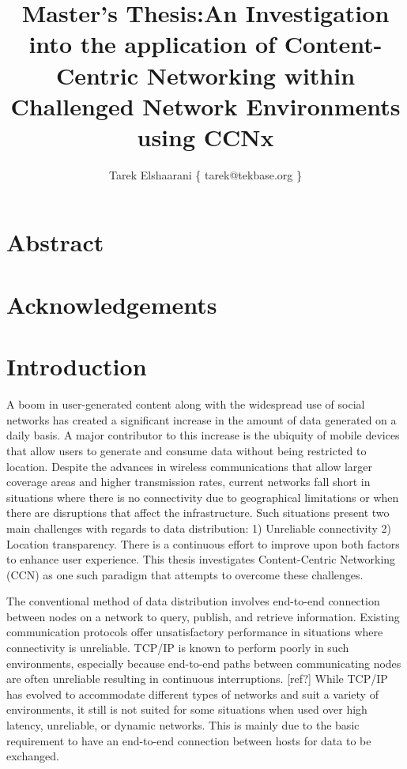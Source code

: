 \documentclass[a4paper,12pt]{report}      %
\title{Master's Thesis:\endgraf An Investigation into the application of Content-Centric Networking within Challenged Network Environments using CCNx}
\author{Tarek Elshaarani \{ tarek@tekbase.org \}}
\date{\parbox{\linewidth}{\centering
  \bigskip
  \today\endgraf
  \vspace*{7cm}
  Supervisors: \endgraf
  \hspace*{1cm} Frederik Hermans   \{ frederik.hermans@it.uu.se \} \endgraf
  \hspace*{1cm} Ferdrik Bjurefors  \{ fredrik.bjurefors@it.uu.se \} \endgraf
  \bigskip
  Reviewer: \endgraf
  \hspace*{1cm} Christian Rohner   \{ christian.rohner@it.uu.se \}\endgraf
  \bigskip\bigskip
  Department of Information Technology\endgraf
  Uppsala Universitet}}
\begin{document}

\maketitle                   %

\pagebreak
\chapter*{Abstract}

\pagebreak
\chapter*{Acknowledgements}
%
% 
%
%

\tableofcontents %

\pagebreak
\chapter{Introduction}
A boom in user-generated content along with the widespread use of social networks has created a significant increase in the amount of data generated on a daily basis. A major contributor to this increase is the ubiquity of mobile devices that allow users to generate and consume data without being restricted to location. Despite the advances in wireless communications that allow larger coverage areas and higher transmission rates, current networks fall short in situations where there is no connectivity due to geographical limitations or when there are disruptions that affect the infrastructure. Such situations present two main challenges with regards to data distribution: 1) Unreliable connectivity 2) Location transparency. There is a continuous effort to improve upon both factors to enhance user experience. This thesis investigates Content-Centric Networking (CCN) as one such paradigm that
attempts to overcome these challenges.

The conventional method of data distribution involves end-to-end connection between nodes on a network to query, publish, and retrieve information. Existing communication protocols offer unsatisfactory performance in situations where connectivity is unreliable. TCP/IP is known to perform poorly in such environments, especially because end-to-end paths between communicating nodes are often unreliable resulting in continuous interruptions. [ref?] While TCP/IP has evolved to accommodate different types of networks and suit a variety of environments, it still is not suited for some situations when used over high latency, unreliable, or dynamic networks. This is mainly due to the basic requirement to have an end-to-end connection between hosts for data to be exchanged.
\end{document}
